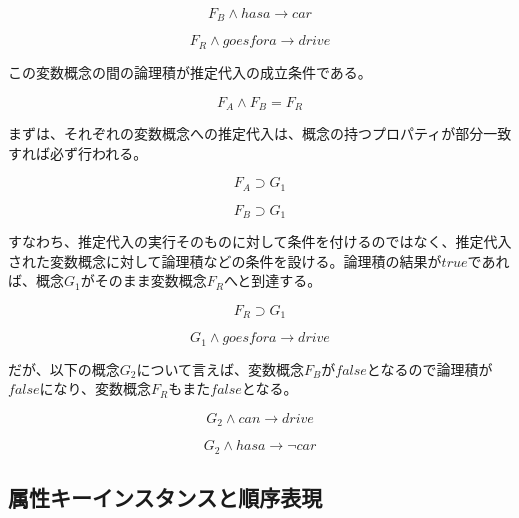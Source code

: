 \documentclass[12pt]{article}
\begin{document}
\begin{equation} F_B \wedge hasa \rightarrow car\end{equation}

\begin{equation} F_R \wedge goesfora \rightarrow drive \end{equation}

この変数概念の間の論理積が推定代入の成立条件である。

\begin{equation}  F_A \wedge F_B = F_R\end{equation}

まずは、それぞれの変数概念への推定代入は、概念の持つプロパティが部分一致すれば必ず行われる。

\begin{equation} F_A \supset G_1 \end{equation}

\begin{equation} F_B \supset G_1 \end{equation}

すなわち、推定代入の実行そのものに対して条件を付けるのではなく、推定代入された変数概念に対して論理積などの条件を設ける。論理積の結果が\(true\)であれば、概念\(G_1\)がそのまま変数概念\(F_R\)へと到達する。

\begin{equation} F_R \supset G_1 \end{equation}

\begin{equation} G_1 \wedge goesfora \rightarrow drive \end{equation}

だが、以下の概念\(G_2\)について言えば、変数概念\(F_B\)が\(false\)となるので論理積が\(false\)になり、変数概念\(F_R\)もまた\(false\)となる。

\begin{equation} G_2 \wedge can \rightarrow drive \end{equation}

\begin{equation} G_2 \wedge hasa \rightarrow \neg car \end{equation}

\subsection{属性キーインスタンスと順序表現}\label{ux5c5eux6027ux30adux30fcux30a4ux30f3ux30b9ux30bfux30f3ux30b9ux3068ux9806ux5e8fux8868ux73fe}
\end{document}
